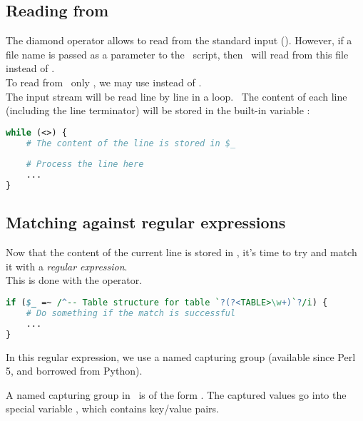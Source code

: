 \newpage

\subsection*{Reading from \stdin}

The diamond operator \cmd{<>} allows to read from the standard input (\stdin). However, if a file name is passed as a parameter to the \perl\ script, then \perl\ will read from this file instead of \stdin. \\

To read from \stdin\ only , we may use  instead of \cmd{<>}. \\

The input stream will be read line by line in a  loop. \
The content of each line (including the \cmd{\n} line terminator) will be stored in the built-in variable \cmd{\$_} :

\begin{lstlisting}[language=perl]
while (<>) {
	# The content of the line is stored in $_
	
	# Process the line here
	...
}
\end{lstlisting}





\medskip

\subsection*{Matching against regular expressions}

Now that the content of the current line is stored in \cmd{\$_}, it's time to try and match it with a \emph{regular expression}. \\

This is done with the \cmd{=~} operator.

\begin{lstlisting}[language=perl]
if ($_ =~ /^-- Table structure for table `?(?<TABLE>\w+)`?/i) {
	# Do something if the match is successful
	...
}
\end{lstlisting}

In this regular expression, we use a named capturing group (available since Perl 5, and borrowed from Python). 

A named capturing group in \perl\ is of the form . 
The captured values go into the special variable \cmd{\$+}, which contains key/value pairs. \\

